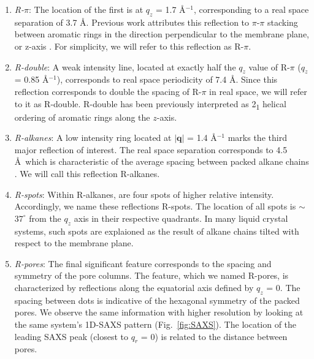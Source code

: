 \documentclass[journal=jpcbfk,manuscript=article]{achemso}
\begin{document}
  \begin{enumerate} 
  
	\item \textit{R-$\pi$}: The location of the first is at $q_z$ = 1.7
	\AA$^{-1}$, corresponding to a real space separation of 3.7 {\AA}. Previous
	work attributes this reflection to $\pi$-$\pi$
	stacking between aromatic rings in the direction perpendicular to the membrane
	plane, or z-axis \cite{feng_scalable_2014}. For simplicity, we will refer to
	this reflection as R-$\pi$.
 
	\item \textit{R-double}: A weak intensity line, located at exactly half
	the $q_z$ value of R-$\pi$ ($q_z$ = 0.85 \AA$^{-1}$), corresponds to real
	space periodicity of 7.4 \AA. Since this reflection corresponds to double
	the spacing of R-$\pi$ in real space, we will refer to it as R-double. 
	R-double has been previously interpreted as 2\textsubscript{1} helical ordering of aromatic
	rings along the $z$-axis\cite{feng_scalable_2014}.

	\item \textit{R-alkanes}: A low intensity ring located at $|\mathbf{q}|$ = 1.4
	\AA$^{-1}$ marks the third major reflection of interest. The real space
	separation corresponds to 4.5 \AA~which is characteristic of the average
	spacing between packed alkane chains \cite{mcintosh_organization_1980}. We will
	call this reflection R-alkanes.

	\item \textit{R-spots}: Within R-alkanes, are four spots of higher
	relative intensity.  Accordingly, we name these reflections R-spots. The
	location of all spots is $\sim$$37^{\circ}$ from the $q_z$ axis in their
	respective quadrants. In many liquid crystal systems, such spots are explaioned
	as the result of alkane chains tilted with respect to the membrane
	plane\cite{govind_simple_2001}.
 
	\item \textit{R-pores}: The final significant feature corresponds to the spacing
	and symmetry of the pore columns. The feature, which we named R-pores,
	is characterized by reflections along the equatorial axis defined by $q_z$ = 0.
	The spacing between dots is indicative of the hexagonal symmetry of the packed
	pores. We observe the same information with higher resolution by looking at the
	same system's 1D-SAXS pattern (Fig.~\ref{fig:SAXS}). The location of the
	leading SAXS peak (closest to $q_r$ = 0) is related to the distance between
	pores.
  \end{enumerate}
\end{document}
